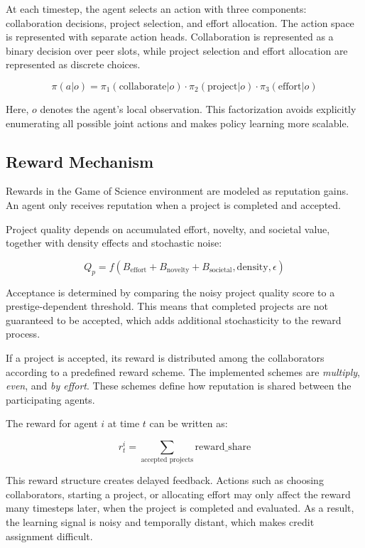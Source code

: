 \documentclass[english,bachelor]{hsluthesis}
\begin{document}
At each timestep, the agent selects an action with three components: collaboration decisions, project selection, and effort allocation. The action space is represented with separate action heads. Collaboration is represented as a binary decision over peer slots, while project selection and effort allocation are represented as discrete choices.

\begin{equation}
\pi(a|o)=\pi_1(\text{collaborate}|o)\cdot\pi_2(\text{project}|o)\cdot\pi_3(\text{effort}|o)
\end{equation}

Here, $o$ denotes the agent's local observation. This factorization avoids explicitly enumerating all possible joint actions and makes policy learning more scalable.

\subsection{Reward Mechanism}

Rewards in the Game of Science environment are modeled as reputation gains. An agent only receives reputation when a project is completed and accepted.

Project quality depends on accumulated effort, novelty, and societal value, together with density effects and stochastic noise:

\begin{equation}
Q_p = f(B_{\text{effort}} + B_{\text{novelty}} + B_{\text{societal}}, \text{density}, \epsilon)
\end{equation}

Acceptance is determined by comparing the noisy project quality score to a prestige-dependent threshold. This means that completed projects are not guaranteed to be accepted, which adds additional stochasticity to the reward process.

If a project is accepted, its reward is distributed among the collaborators according to a predefined reward scheme. The implemented schemes are \textit{multiply}, \textit{even}, and \textit{by effort}. These schemes define how reputation is shared between the participating agents.

The reward for agent $i$ at time $t$ can be written as:

\begin{equation}
r_t^i = \sum_{\text{accepted projects}} \text{reward\_share}
\end{equation}

This reward structure creates delayed feedback. Actions such as choosing collaborators, starting a project, or allocating effort may only affect the reward many timesteps later, when the project is completed and evaluated. As a result, the learning signal is noisy and temporally distant, which makes credit assignment difficult.
\end{document}
